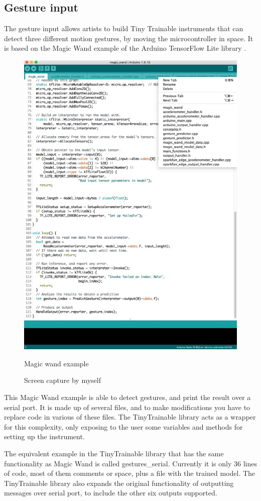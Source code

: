 \subsection{Gesture input}

The gesture input allows artists to build Tiny Trainable instruments that can detect three different motion gestures, by moving the microcontroller in space. It is based on the Magic Wand example of the Arduino TensorFlow Lite library \cite{repository-tensorflow-tflite-micro-magic-wand}.

\begin{figure}[ht]
  \centering
  \includegraphics[width=0.75\linewidth,height=0.40\textheight,keepaspectratio]{images/arduino-tensorflow-lite-magic-wand.jpg}
  \caption{Magic wand example}
  \caption*{Screen capture by myself}
  \label{fig:arduino-tensorflow-lite-magic-wand}
\end{figure}

This Magic Wand example is able to detect gestures, and print the result over a serial port. It is made up of several files, and to make modifications you have to replace code in various of these files. The TinyTrainable library acts as a wrapper for this complexity, only exposing to the user some variables and methods for setting up the instrument.

The equivalent example in the TinyTrainable library that has the same functionality as Magic Wand is called gestures{\_}serial. Currently it is only 36 lines of code, most of them comments or space, plus a file with the trained model. The TinyTrainable library also expands the original functionality of outputting messages over serial port, to include the other six outputs supported.

